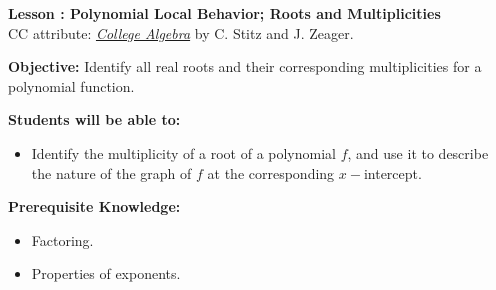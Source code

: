 \documentclass[12pt]{article}
\theoremstyle{definition}
\begin{document}
{\bf \large Lesson : Polynomial Local Behavior; Roots and Multiplicities}
\\ CC attribute: \href{http://www.stitz-zeager.com}{\it{College Algebra}} by C. Stitz and J. Zeager. 
\hfill \doclicenseImage[imagewidth=5em]\\
\par
{\bf Objective:} Identify all real roots and their corresponding multiplicities for a polynomial function.\\
\par
{\bf Students will be able to:}
\begin{itemize}
	\item Identify the multiplicity of a root of a polynomial $f$, and use it to describe the nature of the graph of $f$ at the corresponding $x-$intercept. 
\end{itemize}
{\bf Prerequisite Knowledge:}
\begin{itemize}
	\item Factoring.
	\item Properties of exponents.
\end{itemize}
\hrulefill
\end{document}
